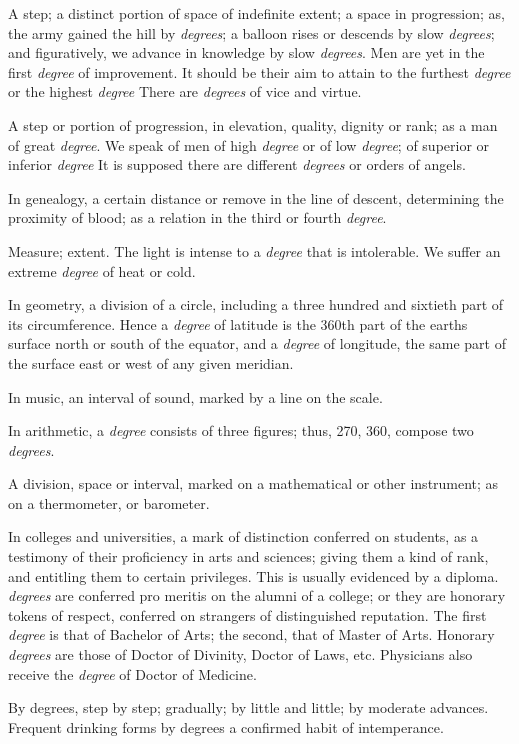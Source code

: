 	\begin{compactitem}
		\item[1] A step; a distinct portion of space of indefinite extent; a space in progression; as, the army gained the hill by \textit{degrees}; a balloon rises or descends by slow \textit{degrees}; and figuratively, we advance in knowledge by slow \textit{degrees}. Men are yet in the first \textit{degree} of improvement. It should be their aim to attain to the furthest \textit{degree} or the highest \textit{degree} There are \textit{degrees} of vice and virtue.
		\item[2] A step or portion of progression, in elevation, quality, dignity or rank; as a man of great \textit{degree}. We speak of men of high \textit{degree} or of low \textit{degree}; of superior or inferior \textit{degree} It is supposed there are different \textit{degrees} or orders of angels.
		\item[3] In genealogy, a certain distance or remove in the line of descent, determining the proximity of blood; as a relation in the third or fourth \textit{degree}.
		\item[4] Measure; extent. The light is intense to a \textit{degree} that is intolerable. We suffer an extreme \textit{degree} of heat or cold.
		\item[5] In geometry, a division of a circle, including a three hundred and sixtieth part of its circumference. Hence a \textit{degree} of latitude is the 360th part of the earths surface north or south of the equator, and a \textit{degree} of longitude, the same part of the surface east or west of any given meridian.
		\item[6] In music, an interval of sound, marked by a line on the scale.
		\item[7] In arithmetic, a \textit{degree} consists of three figures; thus, 270, 360, compose two \textit{degrees}.
		\item[8] A division, space or interval, marked on a mathematical or other instrument; as on a thermometer, or barometer.
		\item[9] In colleges and universities, a mark of distinction conferred on students, as a testimony of their proficiency in arts and sciences; giving them a kind of rank, and entitling them to certain privileges. This is usually evidenced by a diploma. \textit{degrees} are conferred pro meritis on the alumni of a college; or they are honorary tokens of respect, conferred on strangers of distinguished reputation. The first \textit{degree} is that of Bachelor of Arts; the second, that of Master of Arts. Honorary \textit{degrees} are those of Doctor of Divinity, Doctor of Laws, etc. Physicians also receive the \textit{degree} of Doctor of Medicine.
		\item By degrees, step by step; gradually; by little and little; by moderate advances. Frequent drinking forms by degrees a confirmed habit of intemperance.
	\end{compactitem}

